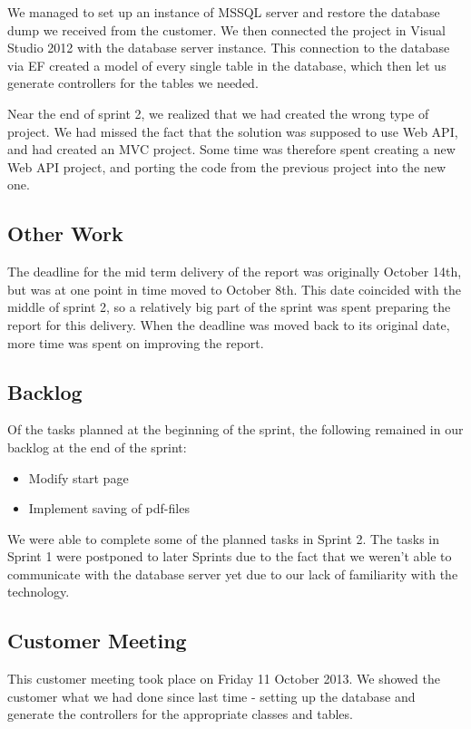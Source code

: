 We managed to set up an instance of MSSQL server and restore the database dump we received from the customer. We then connected the project in Visual Studio 2012 with the database server instance. This connection to the database via EF created a model of every single table in the database, which then let us generate controllers for the tables we needed.

Near the end of sprint 2, we realized that we had created the wrong type of project. We had missed the fact that the solution was supposed to use Web API, and had created an MVC project. Some time was therefore spent creating a new Web API project, and porting the code from the previous project into the new one.

\subsection{Other Work}
The deadline for the mid term delivery of the report was originally October 14th, but was at one point in time moved to October 8th. This date coincided with the middle of sprint 2, so a relatively big part of the sprint was spent preparing the report for this delivery. When the deadline was moved back to its original date, more time was spent on improving the report.

\subsection{Backlog}
Of the tasks planned at the beginning of the sprint, the following remained in our backlog at the end of the sprint:
\begin{itemize}
	\item Modify start page
	\item Implement saving of pdf-files
\end{itemize}
We were able to complete some of the planned tasks in Sprint 2. The tasks in Sprint 1 were postponed to later Sprints due to the fact that we weren't able to communicate with the database server yet due to our lack of familiarity with the technology.

\subsection{Customer Meeting}
This customer meeting took place on Friday 11 October 2013. We showed the customer what we had done since last time - setting up the database and generate the controllers for the appropriate classes and tables.


